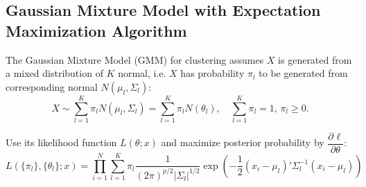     


\subsection{Gaussian Mixture Model with Expectation Maximization Algorithm}\label{SubSubSectionEMAlgorithmForGMM}


        The Gaussian Mixture Model (GMM) for clustering assumes $ X $ is generated from a mixed distribution of $ K $ normal, i.e. $ X $ has probability $ \pi_l $ to be generated from corresponding normal $ N(\mu _l,\Sigma _l) $:
    \begin{equation}
        X\sim \sum_{l=1}^K\pi_lN(\mu_l,\Sigma _l)=\sum_{l=1}^K\pi_lN(\theta _l),\quad \sum_{l=1}^K\pi_l=1,\,\pi_l\geq 0.
    \end{equation}
    
    Use its likelihood function $ L(\theta;x) $ and maximize posterior probability by $ \dfrac{\partial^{} \ell}{\partial \theta ^{}} $:
    \begin{equation}
        L(\{\pi_l\},\{\theta_l \};x)=\prod_{i=1}^N \sum_{l=1}^K\pi_l   \dfrac{1}{(2\pi)^{p/2}|\Sigma _l|^{1/2}}\exp\left(   -\dfrac{1}{2}(x_i-\mu _l)'\Sigma^{-1} _l(x_i-\mu _l)\right)
    \end{equation}
    
